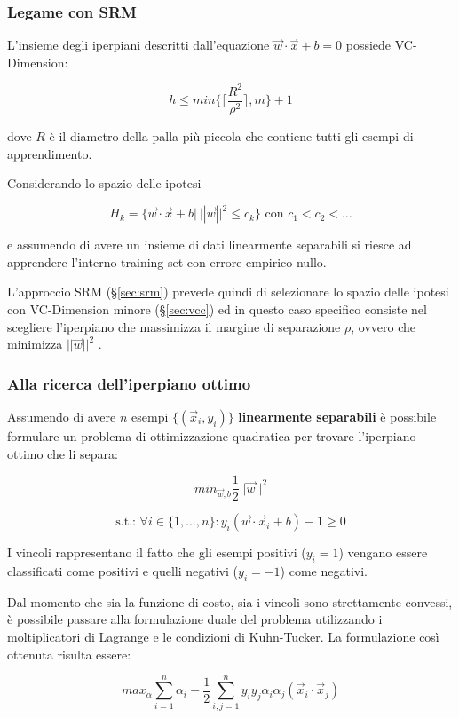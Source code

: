 \subsubsection{Legame con SRM}

L'insieme degli iperpiani descritti dall'equazione $\vec{w} \cdot \vec{x} + b = 0$ possiede VC-Dimension:

$$ h \leq min\{\lceil \frac{R^2}{\rho^2}\rceil, m\} +1$$

dove $R$ è il diametro della palla più piccola che contiene tutti gli esempi di apprendimento.

Considerando lo spazio delle ipotesi

$$H_k = \{\vec{w} \cdot \vec{x} + b | \: ||\vec{w}||^2 \leq c_k\} \text{ con } c_1 < c_2 < \ldots$$

e assumendo di avere un insieme di dati linearmente separabili si riesce ad apprendere l'interno training set con errore empirico nullo.

L'approccio SRM (§\ref{sec:srm}) prevede quindi di selezionare lo spazio delle ipotesi con VC-Dimension minore (§\ref{sec:vcc}) ed in questo caso specifico consiste nel scegliere l'iperpiano che massimizza il margine di separazione $\rho$, ovvero che minimizza $||\vec{w}||^2$ .

\subsubsection{Alla ricerca dell'iperpiano ottimo}

Assumendo di avere $n$ esempi $\{(\vec{x}_i, y_i)\}$ \textbf{linearmente separabili} è possibile formulare un problema di ottimizzazione quadratica per trovare l'iperpiano ottimo che li separa:

$$ min_{\vec{w}, b} \frac{1}{2}||\vec{w}||^2 $$

$$ \text{s.t.: } \forall i \in \{1, \ldots , n\} : y_i(\vec{w} \cdot \vec{x}_i + b) - 1 \geq 0 $$

I vincoli rappresentano il fatto che gli esempi positivi ($y_i = 1$) vengano essere classificati come positivi e quelli negativi ($y_i = -1$) come negativi.

Dal momento che sia la funzione di costo, sia i vincoli sono strettamente convessi, è possibile passare alla formulazione duale del problema utilizzando i moltiplicatori di Lagrange e le condizioni di Kuhn-Tucker.
La formulazione così ottenuta risulta essere:

$$max_\alpha \sum\limits_{i=1}^n \alpha_i - \frac{1}{2}\sum\limits_{i,j = 1}^n y_i y_j \alpha_i \alpha_j (\vec{x}_i \cdot \vec{x}_j)$$

